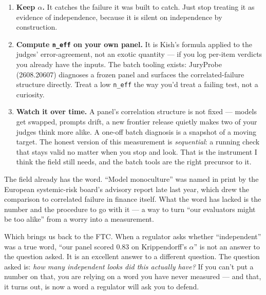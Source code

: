 \documentclass[11pt,a4paper]{article}
\newcommand{\code}[1]{\texttt{#1}}
\begin{document}
\begin{enumerate}[leftmargin=*, label=\arabic*.]
  \item \textbf{Keep $\alpha$.} It catches the failure it was built to catch. Just stop treating it
        as evidence of independence, because it is silent on independence by construction.
  \item \textbf{Compute \code{n\_eff} on your own panel.} It is Kish's formula applied to the
        judges' error-agreement, not an exotic quantity --- if you log per-item verdicts you already
        have the inputs. The batch tooling exists: JuryProbe (2608.20607) diagnoses a frozen panel
        and surfaces the correlated-failure structure directly. Treat a low \code{n\_eff} the way
        you'd treat a failing test, not a curiosity.
  \item \textbf{Watch it over time.} A panel's correlation structure is not fixed --- models get
        swapped, prompts drift, a new frontier release quietly makes two of your judges think more
        alike. A one-off batch diagnosis is a snapshot of a moving target. The honest version of
        this measurement is \emph{sequential}: a running check that stays valid no matter when you
        stop and look. That is the instrument I think the field still needs, and the batch tools are
        the right precursor to it.
\end{enumerate}

The field already has the word. ``Model monoculture'' was named in print by the European
systemic-risk board's advisory report late last year, which drew the comparison to correlated
failure in finance itself. What the word has lacked is the number and the procedure to go with it
--- a way to turn ``our evaluators might be too alike'' from a worry into a measurement.

Which brings us back to the FTC. When a regulator asks whether ``independent'' was a true word,
``our panel scored 0.83 on Krippendorff's $\alpha$'' is not an answer to the question asked. It is
an excellent answer to a different question. The question asked is: \emph{how many independent looks
did this actually have?} If you can't put a number on that, you are relying on a word you have
never measured --- and that, it turns out, is now a word a regulator will ask you to defend.
\end{document}
